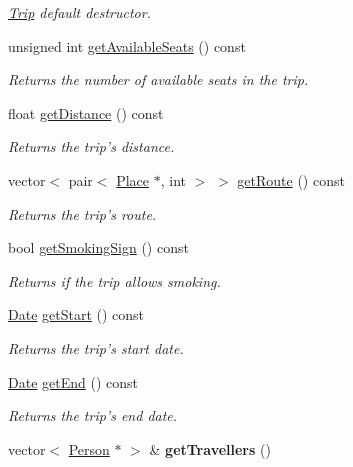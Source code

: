 \begin{DoxyCompactItemize}
\begin{DoxyCompactList}\small\item\em \hyperlink{class_trip}{Trip} default destructor. \end{DoxyCompactList}\item 
unsigned int \hyperlink{class_trip_a48282720f54aa5d56d5ba872868396e6}{get\+Available\+Seats} () const 
\begin{DoxyCompactList}\small\item\em Returns the number of available seats in the trip. \end{DoxyCompactList}\item 
float \hyperlink{class_trip_a40b102c05b9f11486affb653d289503a}{get\+Distance} () const 
\begin{DoxyCompactList}\small\item\em Returns the trip's distance. \end{DoxyCompactList}\item 
vector$<$ pair$<$ \hyperlink{class_place}{Place} $\ast$, int $>$ $>$ \hyperlink{class_trip_a4b1a35b6c36433ce982d7a42b6df796d}{get\+Route} () const 
\begin{DoxyCompactList}\small\item\em Returns the trip's route. \end{DoxyCompactList}\item 
bool \hyperlink{class_trip_a842bbff21be74ba2dbd121728b383653}{get\+Smoking\+Sign} () const 
\begin{DoxyCompactList}\small\item\em Returns if the trip allows smoking. \end{DoxyCompactList}\item 
\hyperlink{class_date}{Date} \hyperlink{class_trip_af48effa8c9d9ff4b8e2e0ff5225d6f60}{get\+Start} () const 
\begin{DoxyCompactList}\small\item\em Returns the trip's start date. \end{DoxyCompactList}\item 
\hyperlink{class_date}{Date} \hyperlink{class_trip_a254a9341368c276926164e0d2cee4748}{get\+End} () const 
\begin{DoxyCompactList}\small\item\em Returns the trip's end date. \end{DoxyCompactList}\item 
\hypertarget{class_trip_a6e2a07b62197450f6e7158d1c3b882bb}{vector$<$ \hyperlink{class_person}{Person} $\ast$ $>$ \& {\bfseries get\+Travellers} ()}\label{class_trip_a6e2a07b62197450f6e7158d1c3b882bb}


\end{DoxyCompactItemize}
